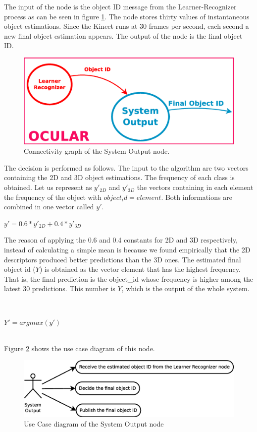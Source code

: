 	The input of the node is the object ID message from the Learner-Recognizer process as can be seen in figure \ref{node_output}.
	The node stores thirty values of instantaneous object estimations. 
	Since the Kinect runs at 30 frames per second, each second a new final object estimation appears. 
	The output of the node is the final object ID. 


		\begin{figure}[H]
			\begin{center}
			\includegraphics[width=0.5\linewidth]{img/diagrams/node_output.eps}
			\caption[System Output node I/O]{Connectivity graph of the System Output node.}		
			\label{node_output}
			\end{center}
		\end{figure}

	The decision is performed as follows. 
	The input to the algorithm are two vectors containing the 2D and 3D object estimations. 
	The frequency of each class is obtained. 
	Let us represent as $y'_{2D}$ and $y'_{3D}$ the vectors containing in each element the frequency of the object with $object_id = element$. 
	Both informations are combined in one vector called $y'$. 
	\\
	\begin{center}
	$y'=0.6*y'_{2D}+0.4*y'_{3D}$
	\end{center}
	The reason of applying the 0.6 and 0.4 constants for 2D and 3D respectively, instead of calculating a simple mean is because we found empirically that the 2D descriptors produced better predictions than the 3D ones.
	The estimated final object id ($Y$) is obtained as the vector element that has the highest frequency. 
	That is, the final prediction is the object_id whose frequency is higher among the latest 30 predictions.
	This number is $Y$, which is the output of the whole system. 

	\\
	\begin{center}
		$Y'= argmax(y')$
	\end{center} 
	\\
	Figure \ref{uc_output} shows the use case diagram of this node. 

	\begin{figure}[H]
		\centering
			\includegraphics[scale=0.4]{img/diagrams/uc_system_output.eps}
			\caption[Use case diagram System Output node]{Use Case diagram of the System Output node}
			\label{uc_output}
	\end{figure}